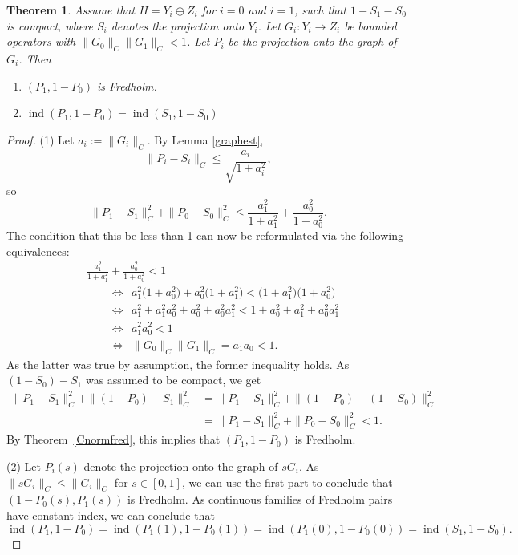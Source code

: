 \documentclass[pdftex]{sigma}
\numberwithin{equation}{section}
\newtheorem{Theorem}{Theorem}[section]
\DeclareMathOperator{\ind}{ind}
\begin{document}
\begin{Theorem}	\label {graphfred}
		Assume that $H=Y_i\oplus Z_i$ for $i=0$ and $i=1$, such that $1-S_1-S_0$ is compact, where $S_i$ denotes the projection onto $Y_i$. Let $G_i\colon Y_i\rightarrow Z_i$ be bounded operators with $\|G_0\|_C\|G_1\|_C<1$. Let $P_i$ be the projection onto the graph of~$G_i$. Then
		\begin{enumerate}\itemsep=0pt
			\item[$(1)$] $(P_1,1-P_0)$ is Fredholm.
			\item[$(2)$] $\ind(P_1,1-P_0)=\ind(S_1,1-S_0)$
		\end{enumerate}
	\end{Theorem}
	\begin{proof}
		(1) Let $a_i:=\|G_i\|_C$. By Lemma \ref{graphest}, \[\|P_i-S_i\|_C\leq\frac{a_i}{\sqrt{1+a_i^2}},\]
			so
			\[\|P_1-S_1\|_C^2+\|P_0-S_0\|_C^2\leq \frac{a_1^2}{1+a_1^2}+\frac{a_0^2}{1+a_0^2}.\]
			The condition that this be less than 1 can now be reformulated via the following equivalences:
			\begin{align*}
				&   \frac{a_1^2}{1+a_1^2}+\frac{a_0^2}{1+a_0^2}<1\\
				&\qquad{}\Leftrightarrow\ \  a_1^2\bigl(1+a_0^2\bigr)+a_0^2\bigl(1+a_1^2\bigr)<\bigl(1+a_1^2\bigr)\bigl(1+a_0^2\bigr)\\
				&\qquad{}\Leftrightarrow\ \  a_1^2+a_1^2a_0^2+a_0^2+a_0^2a_1^2<1+a_0^2+a_1^2+a_0^2a_1^2\\
				&\qquad{}\Leftrightarrow\ \  a_1^2a_0^2<1\\
				&\qquad{}\Leftrightarrow\ \ \|G_0\|_C\|G_1\|_C=a_1a_0<1.
			\end{align*}
			As the latter was true by assumption, the former inequality holds. As $(1-S_0)-S_1$ was assumed to be compact, we get
			 \begin{align*}
			 	\|P_1-S_1\|_C^2+\|(1-P_0)-S_1\|_C^2
				&=\|P_1-S_1\|_C^2+\|(1-P_0)-(1-S_0)\|_C^2\\
				&=\|P_1-S_1\|_C^2+\|P_0-S_0\|_C^2
				<1.
			\end{align*}
By Theorem~\ref{Cnormfred}, this implies that $(P_1,1-P_0)$ is Fredholm.
			

(2) Let $P_i(s)$ denote the projection onto the graph of $sG_i$. As $\|sG_i\|_C\leq\|G_i\|_C$ for $s\in[0,1]$, we can use the first part to conclude that $(1-P_0(s),P_1(s))$ is Fredholm. As continuous families of Fredholm pairs have constant index, we can conclude that
			\[
\ind(P_1,1-P_0)=\ind(P_1(1),1-P_0(1))=\ind(P_1(0),1-P_0(0))=\ind(S_1,1-S_0).
\tag*{\qed}
\]
\renewcommand{\qed}{}
\end{proof}
\end{document}
